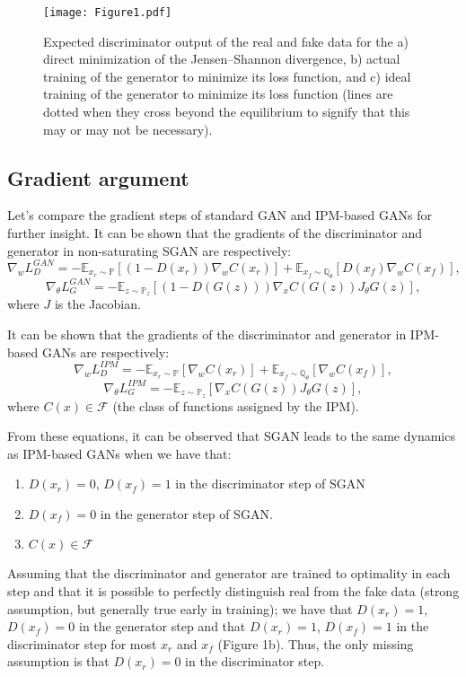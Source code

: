 \documentclass{article}
\begin{document}
\begin{figure}
	\centering
	\texttt{[image: Figure1.pdf]}
	\caption{Expected discriminator output of the real and fake data for the a) direct minimization of the Jensen–Shannon divergence, b) actual training of the generator to minimize its loss function, and c) ideal training of the generator to minimize its loss function (lines are dotted when they cross beyond the equilibrium to signify that this may or may not be necessary).}
\end{figure}

\subsection{Gradient argument}

Let's compare the gradient steps of standard GAN and IPM-based GANs for further insight. It can be shown that the gradients of the discriminator and generator in non-saturating SGAN are respectively:
\begin{equation}
	\nabla_{w}L_D^{GAN} = -\mathbb{E}_{x_r \sim \mathbb{P}}\left[ (1-D(x_r)) \nabla_{w} C(x_r) \right] + \mathbb{E}_{x_f \sim \mathbb{Q_\theta}} \left[ D(x_f) \nabla_{w} C(x_f) \right],
\end{equation}
\begin{equation}
\nabla_{\theta}L_G^{GAN} = -\mathbb{E}_{z \sim \mathbb{P}_z} \left[ (1-D(G(z))) \nabla_{x} C(G(z)) J_{\theta} G(z) \right],
\end{equation}
where $J$ is the Jacobian.

It can be shown that the gradients of the discriminator and generator in IPM-based GANs are respectively:
\begin{equation}
\nabla_{w}L_D^{IPM} = - \mathbb{E}_{x_r \sim \mathbb{P}} [\nabla_{w}C(x_r)] + \mathbb{E}_{x_f \sim \mathbb{Q_\theta}}[\nabla_{w}C(x_f)],
\end{equation}
\begin{equation}
\nabla_{\theta}L_G^{IPM} = - \mathbb{E}_{z \sim \mathbb{P}_z}[\nabla_{x} C(G(z)) J_{\theta} G(z)],
\end{equation}
where $C(x) \in \mathcal{F}$ (the class of functions assigned by the IPM).

From these equations, it can be observed that SGAN leads to the same dynamics as IPM-based GANs when we have that:
\begin{enumerate}
	\item $D(x_r)=0$, $D(x_f)=1$ in the discriminator step of SGAN
	\item $D(x_f)=0$ in the generator step of SGAN.
	\item $C(x) \in \mathcal{F}$
\end{enumerate}
Assuming that the discriminator and generator are trained to optimality in each step and that it is possible to perfectly distinguish real from the fake data (strong assumption, but generally true early in training); we have that $D(x_r)=1$, $D(x_f)=0$ in the generator step and that $D(x_r)=1$, $D(x_f)=1$ in the discriminator step for most $x_r$ and $x_f$ (Figure 1b). Thus, the only missing assumption is that $D(x_r)=0$ in the discriminator step. 
\end{document}
